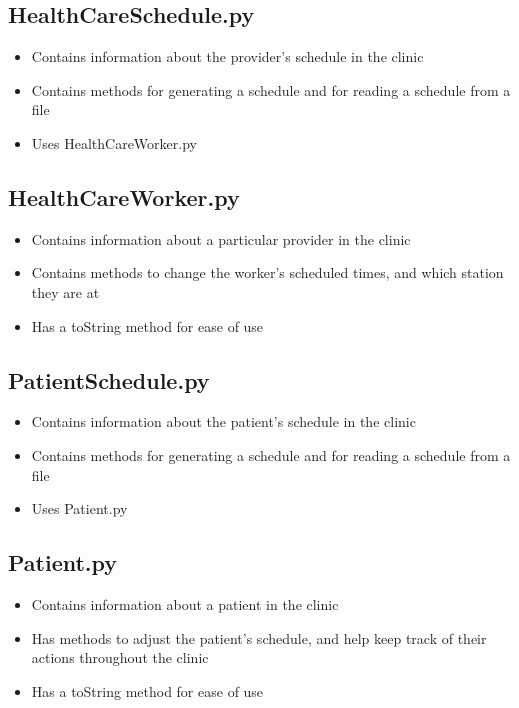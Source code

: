 \documentclass[12pt]{article}
\begin{document}
\subsection{HealthCareSchedule.py}
\begin{itemize}  
\item Contains information about the provider's schedule in the clinic
\item Contains methods for generating a schedule and for reading a schedule from a file
\item Uses HealthCareWorker.py
\end{itemize}

\subsection{HealthCareWorker.py}
\begin{itemize}  
\item Contains information about a particular provider in the clinic
\item Contains methods to change the worker's scheduled times, and which station they are at
\item Has a toString method for ease of use
\end{itemize}

\subsection{PatientSchedule.py}
\begin{itemize}  
\item Contains information about the patient's schedule in the clinic
\item Contains methods for generating a schedule and for reading a schedule from a file
\item Uses Patient.py
\end{itemize}

\subsection{Patient.py}
\begin{itemize}  
\item Contains information about a patient in the clinic
\item Has methods to adjust the patient's schedule, and help keep track of their actions throughout the clinic
\item Has a toString method for ease of use
\end{itemize}
\end{document}
